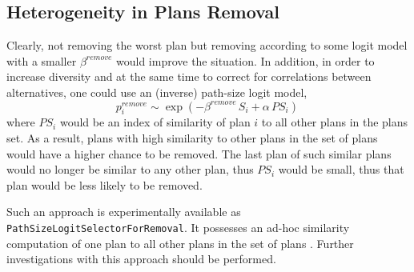 \subsection{Heterogeneity in Plans Removal}

Clearly, not removing the worst plan but removing according to some logit model with a smaller $\beta^{remove}$ would improve the situation.  In addition, in order to increase diversity and at the same time to correct for correlations between alternatives, one could use an (inverse) path-size logit \citep[e.g.][]{FrejingerBierlaire2007PathSizeLogit,Prato2009ChoiceModellingSurvey,Schuessler_PhDThesis_2010} model, \ie
\[
p^{remove}_i \sim \exp( - \beta^{remove} \, S_i + \alpha \, PS_i ) \, 
\]
where $PS_i$ would be an index of similarity of plan $i$ to all other plans in the plans set.  As a result, plans with high similarity to other plans in the set of plans would have a higher chance to be removed.  The last plan of such similar plans would no longer be similar to any other plan, thus $PS_i$ would be small, thus that plan would be less likely to be removed.

Such an approach is experimentally available as \lstinline{PathSizeLogitSelectorForRemoval}.  It possesses an ad-hoc similarity computation of one plan to all other plans in the set of plans \citep[][]{Grether2014PhD}. Further investigations with this approach should be performed.





